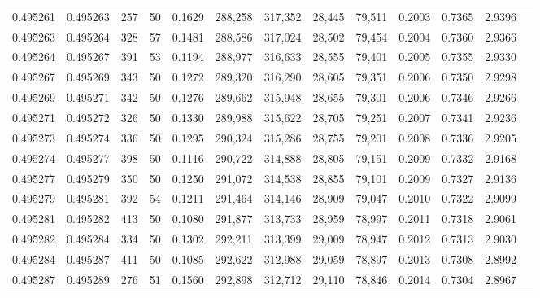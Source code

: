 \begin{tabular}{rrrrrrrrrrrrr}
0.495261 & 0.495263 &   257 &  50 &                                     0.1629 & 288,258 & 317,352 &  28,445 &  79,511 & 0.2003 & 0.7365 & 2.9396 \\
0.495263 & 0.495264 &   328 &  57 &                                     0.1481 & 288,586 & 317,024 &  28,502 &  79,454 & 0.2004 & 0.7360 & 2.9366 \\
0.495264 & 0.495267 &   391 &  53 &                                     0.1194 & 288,977 & 316,633 &  28,555 &  79,401 & 0.2005 & 0.7355 & 2.9330 \\
0.495267 & 0.495269 &   343 &  50 &                                     0.1272 & 289,320 & 316,290 &  28,605 &  79,351 & 0.2006 & 0.7350 & 2.9298 \\
0.495269 & 0.495271 &   342 &  50 &                                     0.1276 & 289,662 & 315,948 &  28,655 &  79,301 & 0.2006 & 0.7346 & 2.9266 \\
0.495271 & 0.495272 &   326 &  50 &                                     0.1330 & 289,988 & 315,622 &  28,705 &  79,251 & 0.2007 & 0.7341 & 2.9236 \\
0.495273 & 0.495274 &   336 &  50 &                                     0.1295 & 290,324 & 315,286 &  28,755 &  79,201 & 0.2008 & 0.7336 & 2.9205 \\
0.495274 & 0.495277 &   398 &  50 &                                     0.1116 & 290,722 & 314,888 &  28,805 &  79,151 & 0.2009 & 0.7332 & 2.9168 \\
0.495277 & 0.495279 &   350 &  50 &                                     0.1250 & 291,072 & 314,538 &  28,855 &  79,101 & 0.2009 & 0.7327 & 2.9136 \\
0.495279 & 0.495281 &   392 &  54 &                                     0.1211 & 291,464 & 314,146 &  28,909 &  79,047 & 0.2010 & 0.7322 & 2.9099 \\
0.495281 & 0.495282 &   413 &  50 &                                     0.1080 & 291,877 & 313,733 &  28,959 &  78,997 & 0.2011 & 0.7318 & 2.9061 \\
0.495282 & 0.495284 &   334 &  50 &                                     0.1302 & 292,211 & 313,399 &  29,009 &  78,947 & 0.2012 & 0.7313 & 2.9030 \\
0.495284 & 0.495287 &   411 &  50 &                                     0.1085 & 292,622 & 312,988 &  29,059 &  78,897 & 0.2013 & 0.7308 & 2.8992 \\
0.495287 & 0.495289 &   276 &  51 &                                     0.1560 & 292,898 & 312,712 &  29,110 &  78,846 & 0.2014 & 0.7304 & 2.8967 \\

\end{tabular}
